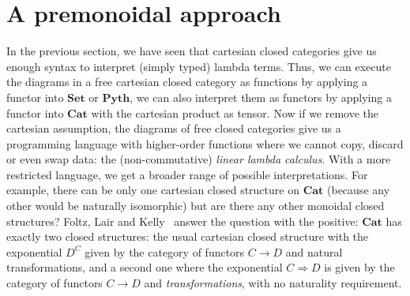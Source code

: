 
\section{A premonoidal approach} \label{section:premonoidal}

In the previous section, we have seen that cartesian closed categories give us enough syntax to interpret (simply typed) lambda terms.
Thus, we can execute the diagrams in a free cartesian closed category as functions by applying a functor into $\mathbf{Set}$ or $\mathbf{Pyth}$, we can also interpret them as functors by applying a functor into $\mathbf{Cat}$ with the cartesian product as tensor.
Now if we remove the cartesian assumption, the diagrams of free closed categories give us a programming language with higher-order functions where we cannot copy, discard or even swap data: the (non-commutative) \emph{linear lambda calculus}.
With a more restricted language, we get a broader range of possible interpretations.
For example, there can be only one cartesian closed structure on $\mathbf{Cat}$ (because any other would be naturally isomorphic) but are there any other monoidal closed structures?
Foltz, Lair and Kelly~\cite{FoltzEtAl80} answer the question with the positive: $\mathbf{Cat}$ has exactly two closed structures: the usual cartesian closed structure with the exponential $D^C$ given by the category of functors $C \to D$ and natural transformations, and a second one where the exponential $C \Rightarrow D$ is given by the category of functors $C \to D$ and \emph{transformations}, with no naturality requirement.

